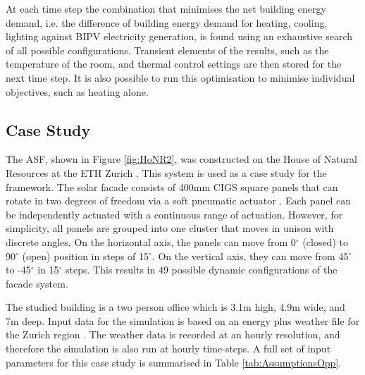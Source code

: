 At each time step the combination that minimises the net building energy demand, i.e. the difference of building energy demand for heating, cooling, lighting against BIPV electricity generation, is found using an exhaustive search of all possible configurations. Transient elements of the results, such as the temperature of the room, and thermal control settings are then stored for the next time step. It is also possible to run this optimisation to minimise individual objectives, such as heating alone.



\subsection{Case Study}

The ASF, shown in Figure \ref{fig:HoNR2}, was constructed on the House of Natural Resources at the ETH Zurich \cite{nagy2016adaptive}. This system is used as a case study for the framework. The solar facade consists of 400mm CIGS square panels that can rotate in two degrees of freedom via a soft pneumatic actuator \cite{svetozarevic2016soro}. Each panel can be independently actuated with a continuous range of actuation. However, for simplicity, all panels are grouped into one cluster that moves in unison with discrete angles. On the horizontal axis, the panels can move from 0$^{\circ}$ (closed) to 90$^{\circ}$ (open) position in steps of 15$^{\circ}$. On the vertical axis, they can move from 45$^{\circ}$ to -45$^{\circ}$ in 15$^{\circ}$ steps. This results in 49 possible dynamic configurations of the facade system.

The studied building is a two person office which is 3.1m high, 4.9m wide, and 7m deep. Input data for the simulation is based on an energy plus weather file for the Zurich region \cite{remund1997meteonorm}. The weather data is recorded at an hourly resolution, and therefore the simulation is also run at hourly time-steps. A full set of input parameters for this case study is summarised in Table \ref{tab:AssumptionsOpp}.



